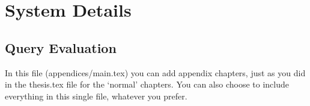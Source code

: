 \chapter{System Details}
\section{Query Evaluation}\label{sec:queryEvaluation}

In this file (appendices/main.tex) you can add appendix chapters, just as you did in the thesis.tex file for the `normal' chapters.
You can also choose to include everything in this single file, whatever you prefer.
